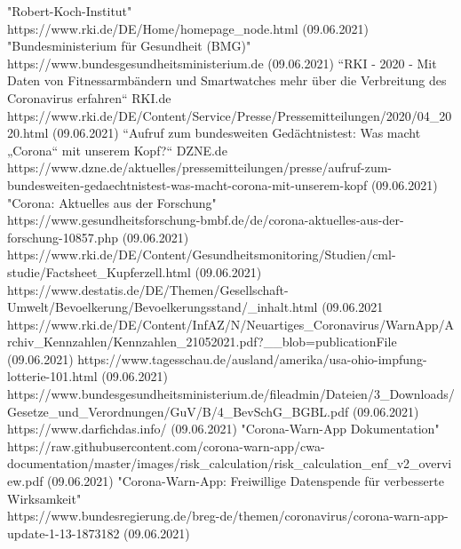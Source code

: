 \documentclass[conference]{IEEEtran}
\begin{document}
\begin{thebibliography}{00}
 "Robert-Koch-Institut" \\ https://www.rki.de/DE/Home/homepage\_node.html (09.06.2021)
 "Bundesministerium für Gesundheit (BMG)" \\ https://www.bundesgesundheitsministerium.de (09.06.2021)
 “RKI - 2020 - Mit Daten von Fitnessarmbändern und Smartwatches mehr über die Verbreitung des Coronavirus erfahren“ RKI.de \\ https://www.rki.de/DE/Content/Service/Presse/Pressemitteilungen/2020/04\_2020.html (09.06.2021)
 “Aufruf zum bundesweiten Gedächtnistest: Was macht „Corona“ mit unserem Kopf?“ DZNE.de \\https://www.dzne.de/aktuelles/pressemitteilungen/presse/aufruf-zum-bundesweiten-gedaechtnistest-was-macht-corona-mit-unserem-kopf (09.06.2021)
 "Corona: Aktuelles aus der Forschung" \\https://www.gesundheitsforschung-bmbf.de/de/corona-aktuelles-aus-der-forschung-10857.php (09.06.2021)
 https://www.rki.de/DE/Content/Gesundheitsmonitoring/Studien/cml-studie/Factsheet\_Kupferzell.html (09.06.2021)
 https://www.destatis.de/DE/Themen/Gesellschaft-Umwelt/Bevoelkerung/Bevoelkerungsstand/\_inhalt.html (09.06.2021
 https://www.rki.de/DE/Content/InfAZ/N/Neuartiges\_Coronavirus/WarnApp/Archiv\_Kennzahlen/Kennzahlen\_21052021.pdf?\_\_blob=publicationFile (09.06.2021)
 https://www.tagesschau.de/ausland/amerika/usa-ohio-impfung-lotterie-101.html (09.06.2021)
 https://www.bundesgesundheitsministerium.de/fileadmin/Dateien/3\_Downloads/Gesetze\_und\_Verordnungen/GuV/B/4\_BevSchG\_BGBL.pdf (09.06.2021)
 https://www.darfichdas.info/ (09.06.2021)
 "Corona-Warn-App Dokumentation" \\https://raw.githubusercontent.com/corona-warn-app/cwa-documentation/master/images/risk\_calculation/risk\_calculation\_enf\_v2\_overview.pdf (09.06.2021)
 "Corona-Warn-App: Freiwillige Datenspende für verbesserte Wirksamkeit" \\https://www.bundesregierung.de/breg-de/themen/coronavirus/corona-warn-app-update-1-13-1873182 (09.06.2021)
\end{thebibliography}
\vspace{12pt}
\end{document}
